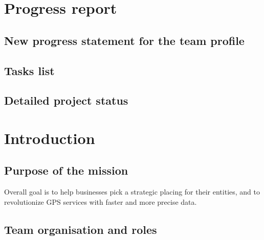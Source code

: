 \documentclass[11pt]{article}
\begin{document}


\tableofcontents
\pagestyle{plain}

\newpage





\section{Progress report}

\subsection{New progress statement for the team profile}

\subsection{Tasks list}

\subsection{Detailed project status}




\section{Introduction}

\subsection{Purpose of the mission}
Overall goal is to help businesses pick a strategic placing for their entities, and to revolutionize GPS services with faster and more precise data. 

\subsection{Team organisation and roles}
\end{document}
